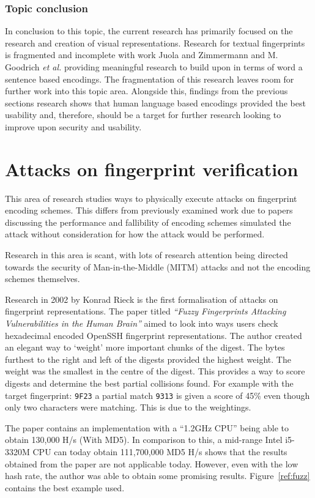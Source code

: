 \subsubsection{Topic conclusion}

In conclusion to this topic, the current research has primarily focused on the research and creation of visual representations. Research for textual fingerprints is fragmented and incomplete with work Juola and Zimmermann 
\cite{juola1996whole} and M. Goodrich \textit{et al.}\cite{goodrich2006loud} providing meaningful research to build upon in terms of word a sentence based encodings. The fragmentation of this research leaves room for further work into this topic area. Alongside this, findings from the previous sections research shows that human language based encodings provided the best usability and, therefore, should be a target for further research looking to improve upon security and usability.

\section{Attacks on fingerprint verification}
This area of research studies ways to physically execute attacks on fingerprint encoding schemes. This differs from previously examined work due to papers discussing the performance and fallibility of encoding schemes simulated the attack without consideration for how the attack would be performed.

Research in this area is scant, with lots of research attention being directed towards the security of Man-in-the-Middle (MITM) attacks and not the encoding schemes themselves.

Research in 2002 by Konrad Rieck\cite{rieck2002fuzzy} is the first formalisation of attacks on fingerprint representations. The paper titled \textit{``Fuzzy Fingerprints Attacking Vulnerabilities in the Human Brain''}
aimed to look into ways users check hexadecimal encoded OpenSSH fingerprint representations. The author created an elegant way to `weight' more important chunks of the digest. The bytes furthest to the right and left of the digests provided the highest weight. The weight was the smallest in the centre of the digest. This provides a way to score digests and determine the best partial collisions found. For example with the target fingerprint: \verb|9F23| a partial match \verb|9313| is given a score of 45\% even though only two characters were matching. This is due to the weightings.

The paper contains an implementation with a ``1.2GHz CPU'' being able to obtain 130,000 H/s (With MD5). In comparison to this, a mid-range Intel i5-3320M CPU can today obtain 111,700,000 MD5 H/s shows that the results obtained from the paper are not applicable today. However, even with the low hash rate, the author was able to obtain some promising results. Figure~\ref{ref:fuzz} contains the best example used.

